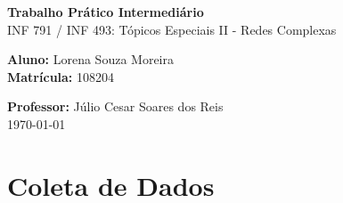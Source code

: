 \documentclass[12pt, a4paper]{article}
\begin{document}
\begin{titlepage}
    \centering %
    \vspace*{\fill} %

    {\huge \textbf{Trabalho Prático Intermediário}} \\
    \vspace{0.5cm} %
    {\Large INF 791 / INF 493: Tópicos Especiais II - Redes Complexas} \\
    
    \vspace{2cm} %
    
    \textbf{Aluno:} Lorena Souza Moreira \\
    \textbf{Matrícula:} 108204 \\
    
    \vspace{1.5cm} %
    
    \textbf{Professor:} Júlio Cesar Soares dos Reis \\
    \vfill %
    \today %

    \vfill %
\end{titlepage}


\tableofcontents
\newpage



\section{Coleta de Dados}

\end{document}
